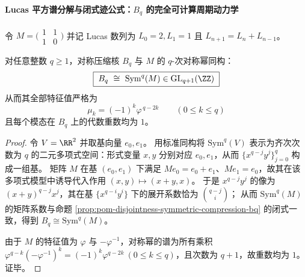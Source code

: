 
\paragraph{Lucas 平方谱分解与闭式迹公式：\texorpdfstring{$B_q$}{Bq} 的完全可计算周期动力学}
令
\(
M=\bigl(\begin{smallmatrix}1&1\\[2pt]1&0\end{smallmatrix}\bigr)
\)
并记 Lucas 数列为 \(L_0=2,L_1=1\) 且 \(L_{n+1}=L_n+L_{n-1}\)。

\begin{proposition}[\texorpdfstring{$B_q=\mathrm{Sym}^q(M)$}{Bq=Sym^q(M)} 与谱闭式]\label{prop:pom-bq-is-symq-and-spectrum}
对任意整数 \(q\ge 1\)，对称压缩核 \(B_q\) 与 \(M\) 的 \(q\)-次对称幂同构：
\[
\boxed{\;B_q\ \cong\ \mathrm{Sym}^q(M)\in \mathrm{GL}_{q+1}(\ZZ)\;}
\]
从而其全部特征值严格为
\[
\boxed{\;\mu_k=(-1)^k\varphi^{\,q-2k}\qquad(0\le k\le q)\;}
\]
且每个模态在 \(B_q\) 上的代数重数均为 \(1\)。
\end{proposition}
\begin{proof}
令 \(V=\RR^2\) 并取基向量 \(e_0,e_1\)。
用标准同构将 \(\mathrm{Sym}^q(V)\) 表示为齐次次数为 \(q\) 的二元多项式空间：形式变量 \(x,y\) 分别对应 \(e_0,e_1\)，从而 \(\{x^{q-j}y^j\}_{j=0}^{q}\) 构成一组基。
矩阵 \(M\) 在基 \((e_0,e_1)\) 下满足 \(Me_0=e_0+e_1\)、\(Me_1=e_0\)，故其在该多项式模型中诱导代入作用
\((x,y)\mapsto (x+y,x)\)。
于是 \(x^{q-j}y^j\) 的像为 \((x+y)^{q-j}x^{j}\)，其在基 \(\{x^{q-i}y^i\}\) 下的展开系数恰为 \(\binom{q-j}{i}\)；
从而 \(\mathrm{Sym}^q(M)\) 的矩阵系数与命题 \ref{prop:pom-disjointness-symmetric-compression-bq} 的闭式一致，得到 \(B_q\cong\mathrm{Sym}^q(M)\)。
\par
由于 \(M\) 的特征值为 \(\varphi\) 与 \(-\varphi^{-1}\)，对称幂的谱为所有乘积 \(\varphi^{q-k}(-\varphi^{-1})^{k}=(-1)^k\varphi^{q-2k}\ (0\le k\le q)\)，且次数为 \(q+1\)，故重数均为 \(1\)。证毕。
\end{proof}


